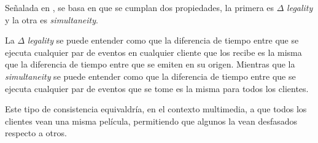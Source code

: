 Señalada en \cite{bouillot2005fast}, se basa en que se cumplan dos propiedades, la primera es $\Delta$ \emph{legality} y la otra es \emph{simultaneity}.

La $\Delta$ \emph{legality} se puede entender como que la diferencia de tiempo entre que se ejecuta cualquier par de eventos en cualquier cliente que los recibe es la misma que la diferencia de tiempo entre que se emiten en su origen. Mientras que la \emph{simultaneity} se puede entender como que la diferencia de tiempo entre que se ejecuta cualquier par de eventos que se tome es la misma para todos los clientes.

Este tipo de consistencia equivaldría, en el contexto multimedia, a que todos los clientes vean una misma película, permitiendo que algunos la vean desfasados respecto a otros.





